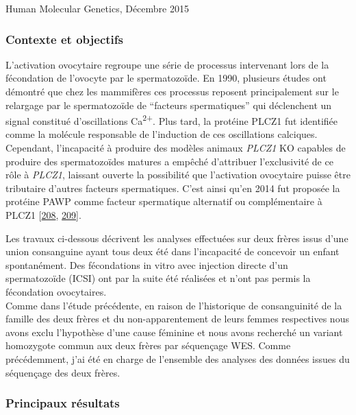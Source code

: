 \documentclass[12pt,a4paper,twoside]{ugathesis}
\theoremstyle{definition}
\theoremstyle{definition}
\theoremstyle{definition}
\theoremstyle{remark}
\begin{document}
Human Molecular Genetics, Décembre 2015

\newpage

\subsubsection{Contexte et objectifs}\label{contexte-et-objectifs-1}

L'activation ovocytaire regroupe une série de processus intervenant lors
de la fécondation de l'ovocyte par le spermatozoïde. En 1990, plusieurs
études ont démontré que chez les mammifères ces processus reposent
principalement sur le relargage par le spermatozoïde de ``facteurs
spermatiques'' qui déclenchent un signal constitué d'oscillations
Ca\textsuperscript{2+}. Plus tard, la protéine PLCZ1 fut identifiée
comme la molécule responsable de l'induction de ces oscillations
calciques. Cependant, l'incapacité à produire des modèles animaux
\emph{PLCZ1} KO capables de produire des spermatozoïdes matures a
empêché d'attribuer l'exclusivité de ce rôle à \emph{PLCZ1}, laissant
ouverte la possibilité que l'activation ovocytaire puisse être
tributaire d'autres facteurs spermatiques. C'est ainsi qu'en 2014 fut
proposée la protéine PAWP comme facteur spermatique alternatif ou
complémentaire à PLCZ1 {[}\protect\hyperlink{ref-Aarabi2014}{208},
\protect\hyperlink{ref-Aarabi2014a}{209}{]}.

Les travaux ci-dessous décrivent les analyses effectuées sur deux frères
issus d'une union consanguine ayant tous deux été dans l'incapacité de
concevoir un enfant spontanément. Des fécondations in vitro avec
injection directe d'un spermatozoïde (ICSI) ont par la suite été
réalisées et n'ont pas permis la fécondation ovocytaires.\\
Comme dans l'étude précédente, en raison de l'historique de
consanguinité de la famille des deux frères et du non-apparentement de
leurs femmes respectives nous avons exclu l'hypothèse d'une cause
féminine et nous avons recherché un variant homozygote commun aux deux
frères par séquençage WES. Comme précédemment, j'ai été en charge de
l'ensemble des analyses des données issues du séquençage des deux
frères.

\newpage



\newpage

\subsubsection{Principaux résultats}\label{principaux-resultats-1}
\end{document}
